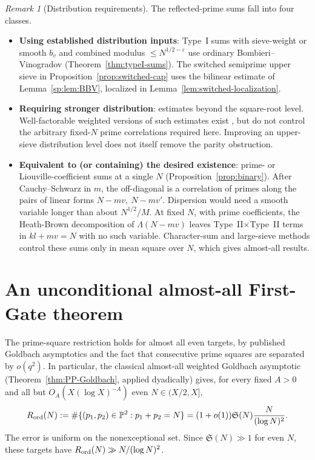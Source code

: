 \documentclass[final,11pt]{elsarticle}
\theoremstyle{definition}
\theoremstyle{remark}
\newtheorem{remark}[theorem]{Remark}
\newcommand{\PP}{\mathbb{P}}
\newcommand{\Sg}{\mathfrak{S}}
\newcommand{\eps}{\varepsilon}
\numberwithin{equation}{section}
\begin{document}
\begin{remark}[Distribution requirements]\label{rem:classification}
The reflected-prime sums fall into four classes.
\begin{itemize}
\item \textbf{Using established distribution inputs}: Type~I sums with sieve-weight or smooth $b_v$ and combined modulus $\le N^{1/2-\eps}$ use ordinary Bombieri--Vinogradov (Theorem~\ref{thm:typeI-sums}). The switched semiprime upper sieve in Proposition~\ref{prop:switched-cap} uses the bilinear estimate of Lemma~\ref{sp:lem:BBV}, localized in Lemma~\ref{lem:switched-localization}.
\item \textbf{Requiring stronger distribution}: estimates beyond the square-root level. Well-factorable weighted versions of such estimates exist \cite{BFI86}, but do not control the arbitrary fixed-$N$ prime correlations required here. Improving an upper-sieve distribution level does not itself remove the parity obstruction.
\item \textbf{Equivalent to (or containing) the desired existence}: prime- or Liouville-coefficient sums at a single $N$ (Proposition~\ref{prop:binary}). After Cauchy--Schwarz in $m$, the off-diagonal is a correlation of primes along the pairs of linear forms $N-mv,\ N-mv'$. Dispersion would need a smooth variable longer than about $N^{1/2}/M$. At fixed $N$, with prime coefficients, the Heath-Brown decomposition of $\Lambda(N-mv)$ leaves Type~II$\times$Type~II terms in $kl+mv=N$ with no such variable. Character-sum and large-sieve methods control these sums only in mean square over $N$, which gives almost-all results.

\end{itemize}
\end{remark}


\section{An unconditional almost-all First-Gate theorem}
\label{sec:almost-all}

The prime-square restriction holds for almost all even targets, by published
Goldbach asymptotics and the fact that consecutive prime squares are separated
by $o(q^2)$. In particular, the classical almost-all weighted Goldbach
asymptotic (Theorem~\ref{thm:PP-Goldbach}, applied dyadically) gives, for every
fixed $A>0$ and all but $O_A(X(\log X)^{-A})$ even $N\in(X/2,X]$,
\[
R_{\rm ord}(N):=\#\{(p_1,p_2)\in\PP^2:p_1+p_2=N\}
=(1+o(1))\Sg(N)\frac{N}{(\log N)^2}.
\]
The error is uniform on the nonexceptional set. Since $\Sg(N)\gg1$ for even
$N$, these targets have $R_{\rm ord}(N)\gg N/(\log N)^2$.
\end{document}
